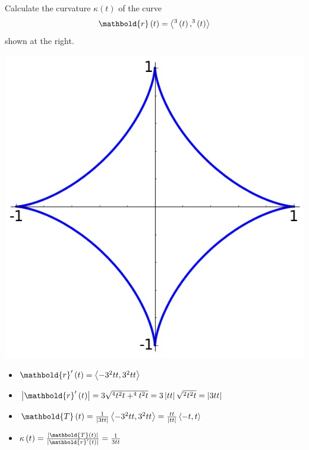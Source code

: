 \documentclass[answers,12pt,addpoints]{exam}
\let\cos\relax\DeclareMathOperator{\cos}{\mathsf{cos}}
\let\sin\relax\DeclareMathOperator{\sin}{\mathsf{sin}}
\begin{document}
\begin{questions}
\ifprintanswers\else\begin{multicols}{2}\fi
\question[25] Calculate the curvature
$\kappa\left(t\right)$ of the curve
\[\mathbold{r}\left(t\right)
=\left\langle\cos^3\left(t\right),\sin^3\left(t\right)
\right\rangle\]
\ifprintanswers\else
shown at the right.
\begin{center}\includegraphics[scale=.4]{Astroid}\end{center}
\end{multicols}\fi
\begin{solution}
\begin{itemize}
\item $\mathbold{r}'\left(t\right)=
\left\langle -3\cos^2{t}\sin{t},3\sin^2{t}\cos{t}
\right\rangle$
\item $\left|\mathbold{r}'\left(t\right)\right|=
3\sqrt{\cos^4{t}\sin^2{t}+\sin^4{t}\cos^2{t}}
=3\left|\cos{t}\sin{t}\right|\sqrt{\sin^2{t}\cos^2{t}}
=\left|3\cos{t}\sin{t}\right|$
\item $\mathbold{T}\left(t\right)
=\frac{1}{\left|3\cos{t}\sin{t}\right|}
\left\langle -3\cos^2{t}\sin{t},3\sin^2{t}\cos{t}
\right\rangle
=\frac{\sin{t}\cos{t}}{\left|\sin{t}\cos{t}\right|}
\left\langle -\cos{t},\sin{t}\right\rangle$
\item $\kappa\left(t\right)
=\frac{\left|\mathbold{T}\left(t\right)\right|}
{\left|\mathbold{r}'\left(t\right)\right|}
=\frac{1}{3\sin{t}\cos{t}}$
\end{itemize}
\end{solution}

\end{questions}
\end{document}

